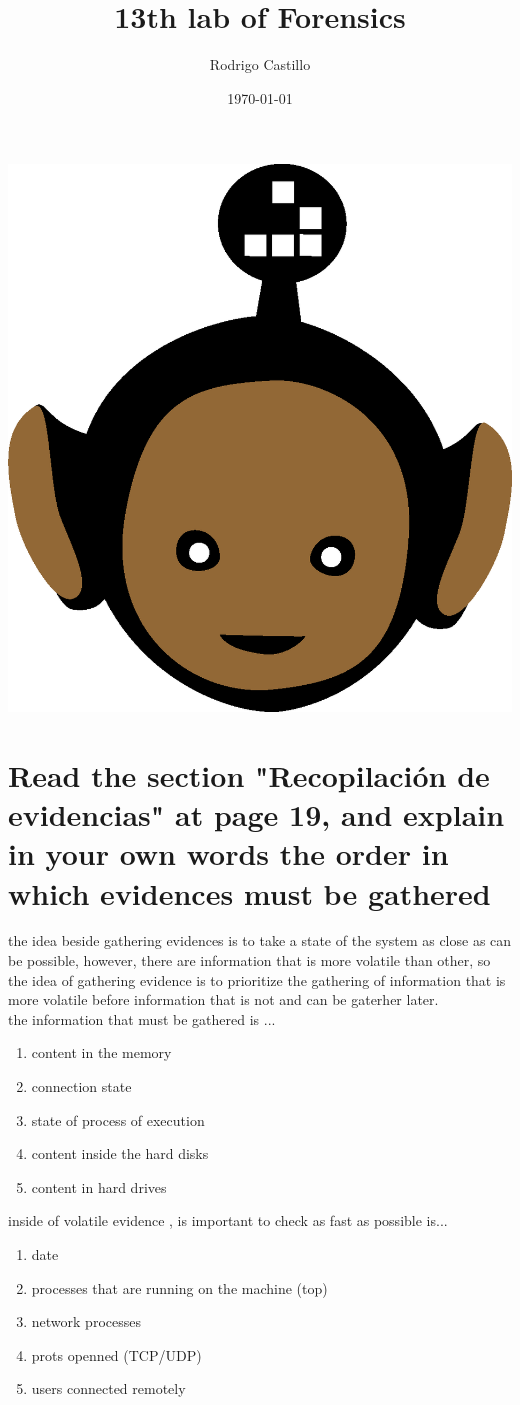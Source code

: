 \documentclass[10pt,a4paper]{article} %
\begin{document}
    \title{{  13th lab of Forensics  }}
    \author{{Rodrigo Castillo}}
    \date{\today}

    \maketitle


    \includegraphics[width=0.1\linewidth]{negro_cara.png}

    \section{Read the section "Recopilación de evidencias" at page 19, and
    explain in your own words the order in which evidences must be gathered}

    the idea beside gathering evidences is to take a state of the system as
    close as can be possible, however, there are information that is more
    volatile than other, so the idea of gathering evidence is to prioritize the
    gathering of information that is more volatile before information that is
    not and can be gaterher later.
    \\
    the information that must be gathered  is ...
    \begin{enumerate}
        \item {content in the memory}
        \item {connection state}
        \item {state of process of execution}
        \item {content inside the hard disks}
        \item {content in hard drives}
    \end{enumerate}
    inside of volatile evidence , is important to check as fast as possible
    is...
    \begin{enumerate}
        \item {date}
        \item {processes that are running on the machine (top)}
        \item {network processes}
        \item {prots openned (TCP/UDP)}
        \item {users connected remotely}
    \end{enumerate}
\end{document}
